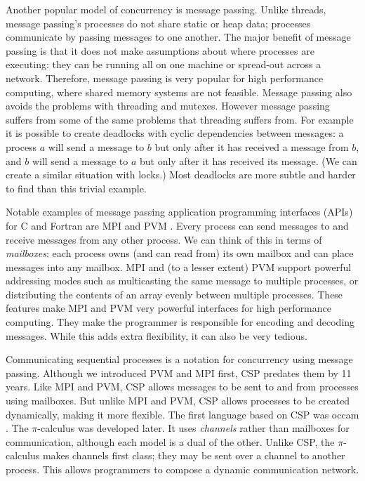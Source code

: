 Another popular model of concurrency is message passing.
Unlike threads, message passing's processes do not share static or heap
data;
processes communicate by passing messages to one another.
The major benefit of message passing is that it does not make assumptions
about where processes are executing:
they can be running all on one machine or spread-out across a network.
Therefore, message passing is very popular for high performance computing,
where shared memory systems are not feasible.
Message passing also avoids the problems with threading and mutexes.
However message passing suffers from some of the same problems that
threading suffers from.
For example it is possible to create deadlocks with cyclic dependencies
between messages:
a process $a$ will send a message to $b$ but only after it has received a
message from $b$,
and $b$ will send a message to $a$ but only after it has received its message.
(We can create a similar situation with locks.)
Most deadlocks are more subtle and harder to find than this trivial example.

Notable examples of message passing application programming interfaces (APIs)
for C and Fortran 
are MPI \citep{mpi} and PVM \citep{pvm}.
Every process can send messages to and receive messages from any other
process.
We can think of this in terms of \emph{mailboxes}:
each process owns (and can read from) its own mailbox and can place messages
into any mailbox.
MPI and (to a lesser extent) PVM
support powerful addressing modes
such as multicasting the same message to multiple processes, or
distributing the contents of an array evenly between
multiple processes.
These features make MPI and PVM very powerful interfaces for high performance
computing.
They make the programmer is responsible for encoding and decoding messages.
While this adds extra flexibility,
it can also be very tedious.

Communicating sequential processes \citep{hoare:1978:CSP} is a notation for
concurrency using message passing.
Although we introduced PVM and MPI first, CSP predates them by 11 years.
Like MPI and PVM, CSP allows messages to be sent to and from processes
using mailboxes.
But unlike MPI and PVM, CSP allows processes to be created dynamically,
making it more flexible.
The first language based on CSP was occam \citep{occam1, occam3}.
The $\pi$-calculus \citep{milner:pi} was developed later.
It uses \emph{channels} rather than mailboxes for communication,
although each model is a dual of the other.
Unlike CSP, the $\pi$-calculus makes channels first class;
they may be sent over a channel to another process.
This allows programmers to compose a dynamic communication network.

